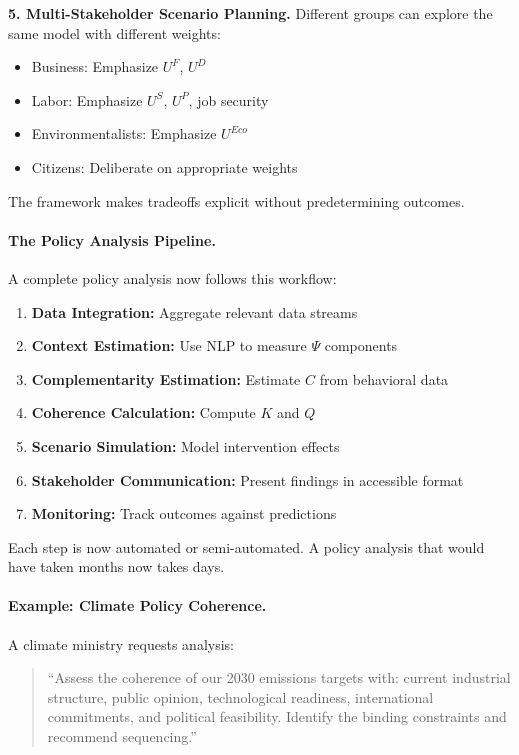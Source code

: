 \documentclass[12pt,a4paper]{article}
\begin{document}
\textbf{5. Multi-Stakeholder Scenario Planning.}
Different groups can explore the same model with different weights:
\begin{itemize}
  \item Business: Emphasize $U^F$, $U^D$
  \item Labor: Emphasize $U^S$, $U^P$, job security
  \item Environmentalists: Emphasize $U^{Eco}$
  \item Citizens: Deliberate on appropriate weights
\end{itemize}

The framework makes tradeoffs explicit without predetermining outcomes.

\paragraph{The Policy Analysis Pipeline.}
A complete policy analysis now follows this workflow:
\begin{enumerate}
  \item \textbf{Data Integration:} Aggregate relevant data streams
  \item \textbf{Context Estimation:} Use NLP to measure $\Psi$ components
  \item \textbf{Complementarity Estimation:} Estimate $C$ from behavioral data
  \item \textbf{Coherence Calculation:} Compute $K$ and $Q$
  \item \textbf{Scenario Simulation:} Model intervention effects
  \item \textbf{Stakeholder Communication:} Present findings in accessible format
  \item \textbf{Monitoring:} Track outcomes against predictions
\end{enumerate}

Each step is now automated or semi-automated.
A policy analysis that would have taken months now takes days.

\paragraph{Example: Climate Policy Coherence.}
A climate ministry requests analysis:
\begin{quote}
``Assess the coherence of our 2030 emissions targets with:
current industrial structure, public opinion, technological readiness,
international commitments, and political feasibility.
Identify the binding constraints and recommend sequencing.''
\end{quote}
\end{document}
